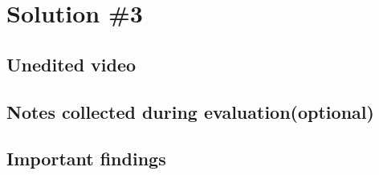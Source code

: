 \section{Solution \#3}
\subsection{Unedited video}

\subsection{Notes collected during evaluation(optional)}

\subsection{Important findings}